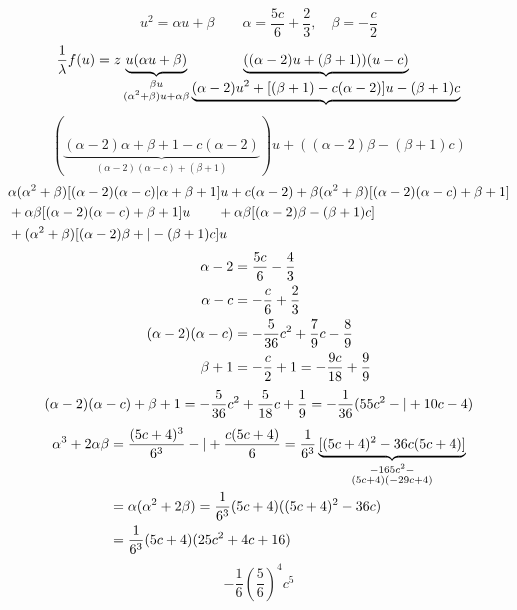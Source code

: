 \[
u^2=\alpha u+\beta\qquad\alpha=\frac{5c}{6}+\frac23,\quad\beta=-\frac c2
\]
\[
\frac1\lambda f(u)=z\underbrace{u(\alpha u+\beta)}_{\substack{\beta u\\(\alpha^2+\beta)u+\alpha\beta}}
\underbrace{((\alpha-2)u+(\beta+1))(u-c)}_{\substack{\underbrace{(\alpha-2)u^2+[(\beta+1)-c(\alpha-2)]u-(\beta+1)c}}}
\]
\[
(\underbrace{(\alpha-2)\alpha+\beta+1-c(\alpha-2)}_{(\alpha-2)(\alpha-c)+(\beta+1)})u+((\alpha-2)\beta-(\beta+1)c)
\]
\[
\begin{aligned}
&\alpha(\alpha^2+\beta)[(\alpha-2)(\alpha-c)|\alpha+\beta+1]u+c(\alpha-2)
+\beta(\alpha^2+\beta)[(\alpha-2)(\alpha-c)+\beta+1]\\
&+\alpha\beta[(\alpha-2)(\alpha-c)+\beta+1]u
\qquad+\alpha\beta[(\alpha-2)\beta-(\beta+1)c]\\
&+(\alpha^2+\beta)[(\alpha-2)\beta+|-(\beta+1)c]u
\end{aligned}
\]
\[
\begin{aligned}
\alpha-2&=\frac{5c}{6}-\frac43\\
\alpha-c&=-\frac c6+\frac23\\
(\alpha-2)(\alpha-c)&=-\frac5{36}c^2+\frac79c-\frac89\\
\beta+1&=-\frac c2+1=-\frac{9c}{18}+\frac99
\end{aligned}
\]
\[
(\alpha-2)(\alpha-c)+\beta+1=-\frac5{36}c^2+\frac5{18}c+\frac19
=-\frac1{36}(55c^2-|+10c-4)
\]
\[
\begin{aligned}
\alpha^3+2\alpha\beta
&=\frac{(5c+4)^3}{6^3}-|+\frac{c(5c+4)}6=\frac1{6^3}\underbrace{[(5c+4)^2-36c(5c+4)]}_{\substack{-165c^2-\\(5c+4)(-29c+4)}}\\
&=\alpha(\alpha^2+2\beta)=\frac1{6^3}(5c+4)((5c+4)^2-36c)\\
&=\frac1{6^3}(5c+4)(25c^2+4c+16)
\end{aligned}
\]
\[ -\frac16\left(\frac56\right)^4c^5 \]
